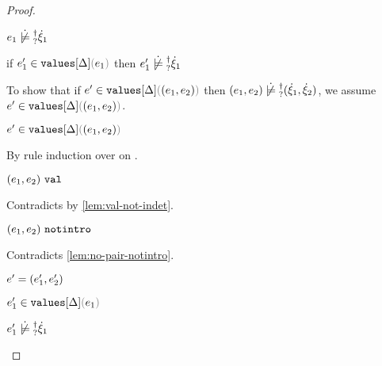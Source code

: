 \begin{proof}
\begin{byCases}
\begin{byCases}
\begin{byCases}
\begin{byCases}
\begin{byCases}
            \begin{pfsteps*}
            \item $\cnotsatisfyormay{e_1}{\hxi_1}$  
            \item if $\inValues{e_1'}{\Delta}{e_1}$ then $\cnotsatisfyormay{e_1'}{\hxi_1}$  
            \end{pfsteps*}
            To show that if $\inValues{e'}{\Delta}{\hpair{e_1}{e_2}}$ then $\cnotsatisfyormay{\hpair{e_1}{e_2}}{\cpair{\hxi_1}{\hxi_2}}$, we assume $\inValues{e'}{\Delta}{\hpair{e_1}{e_2}}$.
            \begin{pfsteps*}
            \item $\inValues{e'}{\Delta}{\hpair{e_1}{e_2}}$  
            \end{pfsteps*}
            By rule induction over  on .
            \begin{byCases}
              \item[\text{(\ref{rule:IVVal})}]
              \begin{pfsteps*}
              \item $(e_1 , e_2) ~\mathtt{val}$ 
              \end{pfsteps*} 
              Contradicts  by \autoref{lem:val-not-indet}.
              \item[\text{(\ref{rule:IVIndet})}] 
              \begin{pfsteps*}
              \item $(e_1 , e_2) ~\mathtt{notintro}$ 
              \end{pfsteps*}
              Contradicts \autoref{lem:no-pair-notintro}.
              \item[\text{(\ref{rule:IVPair})}]
              \begin{pfsteps*}
              \item $e'=(e_1' , e_2')$ 
              \item $\inValues{e_1'}{\Delta}{e_1}$  
              \item $\cnotsatisfyormay{e_1'}{\hxi_1}$  

\end{pfsteps*}
\end{byCases}
\end{byCases}
\end{byCases}
\end{byCases}
\end{byCases}
\end{byCases}
\end{proof}
